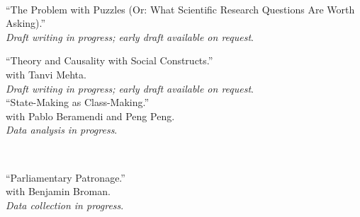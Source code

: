 \documentclass[11pt]{article}
\begin{document}
	\vspace{.3in}
	\begin{minipage}[t]{.21\textwidth}
		\flushright
		 \hspace*{.2in} \\
	\end{minipage}
	\begin{minipage}[t]{.79\textwidth}


		``The Problem with Puzzles (Or: What Scientific Research Questions Are Worth Asking).'' \\
		\emph{Draft writing in progress; early draft available on request}. \\
		\vspace{-.05in}


				``Theory and Causality with Social Constructs.'' \\
				with Tanvi Mehta. \\
				\emph{Draft writing in progress; early draft available on request}. \\

				``State-Making as Class-Making.'' \\
				with Pablo Beramendi and Peng Peng.  \\
				\emph{Data analysis in progress}. \\
				\vspace{-.05in}
\end{minipage}


				\vspace{.3in}
				\begin{minipage}[t]{.21\textwidth}
					\flushright
					\so{ } \hspace*{.2in} \\
				\end{minipage}
				\begin{minipage}[t]{.79\textwidth}

		``Parliamentary Patronage.'' \\
		with Benjamin Broman.  \\
		\emph{Data collection in progress}. \\
\vspace{-.05in}



\end{minipage}
\end{document}
